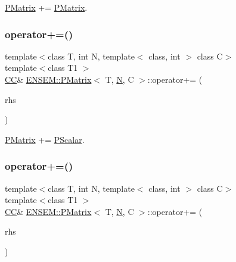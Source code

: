 \mbox{\hyperlink{classENSEM_1_1PMatrix}{P\+Matrix}} += \mbox{\hyperlink{classENSEM_1_1PMatrix}{P\+Matrix}}. 

\mbox{\label{classENSEM_1_1PMatrix_a141db586d4797230e05d41ab13c12a1e}} 
\subsubsection{\texorpdfstring{operator+=()}{operator+=()}\hspace{0.1cm}{\footnotesize\ttfamily [3/4]}}
{\footnotesize\ttfamily template$<$class T, int N, template$<$ class, int $>$ class C$>$ \\
template$<$class T1 $>$ \\
\mbox{\hyperlink{classENSEM_1_1PMatrix_a744bac549029029effe32dc1705660ec}{CC}}\& \mbox{\hyperlink{classENSEM_1_1PMatrix}{E\+N\+S\+E\+M\+::\+P\+Matrix}}$<$ T, \mbox{\hyperlink{operator__name__util_8cc_a7722c8ecbb62d99aee7ce68b1752f337}{N}}, C $>$\+::operator+= (\begin{DoxyParamCaption}\item[{const \mbox{\hyperlink{classENSEM_1_1PScalar}{P\+Scalar}}$<$ T1 $>$ \&}]{rhs }\end{DoxyParamCaption})\hspace{0.3cm}{\ttfamily [inline]}}



\mbox{\hyperlink{classENSEM_1_1PMatrix}{P\+Matrix}} += \mbox{\hyperlink{classENSEM_1_1PScalar}{P\+Scalar}}. 

\mbox{\label{classENSEM_1_1PMatrix_a141db586d4797230e05d41ab13c12a1e}} 
\subsubsection{\texorpdfstring{operator+=()}{operator+=()}\hspace{0.1cm}{\footnotesize\ttfamily [4/4]}}
{\footnotesize\ttfamily template$<$class T, int N, template$<$ class, int $>$ class C$>$ \\
template$<$class T1 $>$ \\
\mbox{\hyperlink{classENSEM_1_1PMatrix_a744bac549029029effe32dc1705660ec}{CC}}\& \mbox{\hyperlink{classENSEM_1_1PMatrix}{E\+N\+S\+E\+M\+::\+P\+Matrix}}$<$ T, \mbox{\hyperlink{operator__name__util_8cc_a7722c8ecbb62d99aee7ce68b1752f337}{N}}, C $>$\+::operator+= (\begin{DoxyParamCaption}\item[{const \mbox{\hyperlink{classENSEM_1_1PScalar}{P\+Scalar}}$<$ T1 $>$ \&}]{rhs }\end{DoxyParamCaption})\hspace{0.3cm}{\ttfamily [inline]}}



